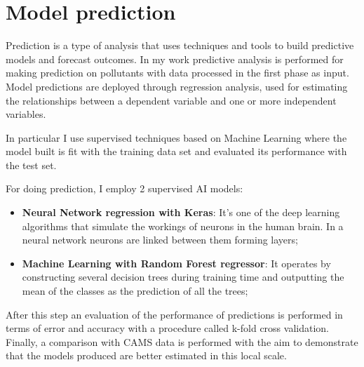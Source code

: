 \section{Model prediction}
Prediction is a type of analysis that uses techniques and tools to build predictive models and forecast outcomes. In my work predictive analysis is performed for making prediction on pollutants with data processed in the first phase as input.\newline
Model predictions are deployed through regression analysis, used for estimating the relationships between a dependent variable and one or more independent variables.\par
In particular I use supervised techniques based on Machine Learning where the model built is fit with the training data set and evaluated its performance with the test set. 

For doing prediction, I employ 2 supervised AI models:
\begin{itemize}
\item \textbf{Neural Network regression with Keras}: It's one of the deep learning algorithms that simulate the workings of neurons in the human brain. In a neural network neurons are linked between them forming layers; 
\item \textbf{Machine Learning with Random Forest regressor}: It operates by constructing several decision trees during training time and outputting the mean of the classes as the prediction of all the trees;
\end{itemize}
After this step an evaluation of the performance of predictions is performed in terms of error and accuracy with a procedure called k-fold cross validation.\newline
Finally, a comparison with CAMS data is performed with the aim to demonstrate that the models produced are better estimated in this local scale.\par


